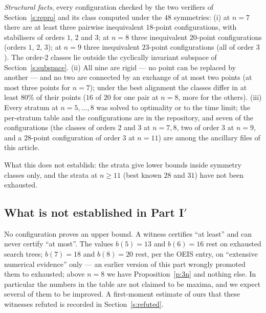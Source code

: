 \documentclass[11pt,a4paper]{article}
\begin{document}
\emph{Structural facts}, every configuration checked by the two verifiers of Section~\ref{s:repro} and its
class computed under the $48$ symmetries: (i) at $n=7$ there are at least three pairwise
inequivalent $18$-point configurations, with stabilisers of orders $1$, $2$ and $3$; at $n=8$
three inequivalent $20$-point configurations (orders $1$, $2$, $3$); at $n=9$ three inequivalent
$23$-point configurations (all of order $3$).  The order-$2$ classes lie outside the cyclically
invariant subspace of Section~\ref{s:subspace}.  (ii) All nine are rigid --- no point can be
replaced by another --- and no two are connected by an exchange of at most two points (at most
three points for $n=7$); under the best alignment the classes differ in at least $80\%$ of
their points ($16$ of $20$ for one pair at $n=8$, more for the others).  (iii) Every stratum at $n=5,\dots,8$ was solved to optimality or to the time limit;
the per-stratum table and the configurations are in the repository, and seven of the configurations (the classes of
orders $2$ and $3$ at $n=7,8$, two of order $3$ at $n=9$, and a $28$-point configuration of order $3$ at $n=11$) are among the
ancillary files of this article.

What this does not establish: the strata give lower bounds inside symmetry classes only, and the
strata at $n\ge11$ (best known $28$ and $31$) have not been exhausted.

\subsection{What is not established in Part I\texorpdfstring{$'$}{'}}\label{s:notest4}
No configuration proves an upper bound.  A witness certifies ``at least'' and can never certify
``at most''.  The values $b(5)=13$ and $b(6)=16$ rest on exhausted search trees; $b(7)=18$ and
$b(8)=20$ rest, per the OEIS entry, on ``extensive numerical evidence'' only --- an earlier
version of this part wrongly promoted them to exhausted; above $n=8$ we have
Proposition~\ref{p:3n} and nothing else.  In particular the numbers
in the table are not claimed to be maxima, and we expect several of them to be improved.  A first-moment
estimate of ours that these witnesses refuted is recorded in Section~\ref{s:refuted}.
\end{document}
